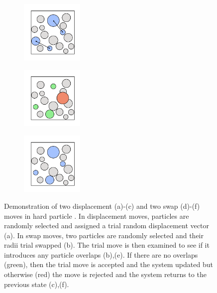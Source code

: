 \begin{figure}[bt]
       \begin{subfigure}[b]{0.25\textwidth}
         \centering
         \includegraphics[width=3cm]{./figures/methods/mc_move_d.pdf}
         \caption{}
         \label{fig:hardmc4}
     \end{subfigure}
     \begin{subfigure}[b]{0.25\textwidth}
         \centering
         \includegraphics[width=3cm]{./figures/methods/mc_move_e.pdf}
         \caption{}
         \label{fig:hardmc5}
     \end{subfigure}
     \begin{subfigure}[b]{0.25\textwidth}
         \centering
         \includegraphics[width=3cm]{./figures/methods/mc_move_f.pdf}
         \caption{}
         \label{fig:hardmc6}
     \end{subfigure}
   
     \caption{Demonstration of two displacement (a)\--(c) and two swap (d)\--(f) moves in hard particle \mc.
     In displacement moves, particles are randomly selected and assigned a trial random displacement vector (a). In swap moves, two particles are randomly selected and their radii trial swapped (b). The trial move is then examined to see if it introduces any particle overlaps (b),(e). If there are no overlaps (green), then the trial move is accepted and the system updated but otherwise (red) the move is rejected and the system returns to the previous state (c),(f).
     }
     \label{fig:hardmc}
     

\end{figure}
